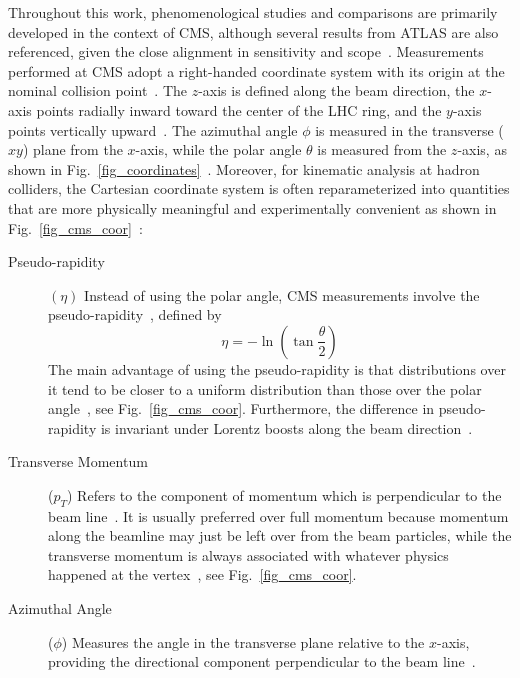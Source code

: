 Throughout this work, phenomenological studies and comparisons are primarily developed in the context of CMS, although several results from ATLAS are also referenced, given the close alignment in sensitivity and scope~\cite{CMS:2008xjf,ATLAS:2008xda}. Measurements performed at CMS adopt a right-handed coordinate system with its origin at the nominal collision point~\cite{CMS:2008xjf}. The $z$-axis is defined along the beam direction, the $x$-axis points radially inward toward the center of the LHC ring, and the $y$-axis points vertically upward~\cite{CMS:2008xjf}. The azimuthal angle $\phi$ is measured in the transverse ($xy$) plane from the $x$-axis, while the polar angle $\theta$ is measured from the $z$-axis, as shown in Fig.~\ref{fig_coordinates}~\cite{CMS:2008xjf}. Moreover, for kinematic analysis at hadron colliders, the Cartesian coordinate system is often reparameterized into quantities that are more physically meaningful and experimentally convenient as shown in Fig.~\ref{fig_cms_coor}~\cite{CMS:PF2017}:

\begin{center}
  
  \label{fig_cms_coor}
\end{center}

\begin{description}
    \item[Pseudo-rapidity] $(\eta)$ Instead of using the polar angle, CMS measurements involve the pseudo-rapidity~\cite{CMS:2008xjf,1674-1137-40-10-100001}, defined by
    $$
    \eta=-\ln \left(\tan \frac{\theta}{2}\right)
    $$
    The main advantage of using the pseudo-rapidity is that distributions over it tend to be closer to a uniform distribution than those over the polar angle~\cite{CMS:PF2017}, see Fig.~\ref{fig_cms_coor}. Furthermore, the difference in pseudo-rapidity is invariant under Lorentz boosts along the beam direction~\cite{1674-1137-40-10-100001}.
    
    \item[Transverse Momentum] ($p_T$) Refers to the component of momentum which is perpendicular to the beam line~\cite{CMS:PF2017}. It is usually preferred over full momentum because momentum along the beamline may just be left over from the beam particles, while the transverse momentum is always associated with whatever physics happened at the vertex~\cite{CMS:PF2017}, see Fig.~\ref{fig_cms_coor}.
    
    \item[Azimuthal Angle] ($\phi$) Measures the angle in the transverse plane relative to the $x$-axis, providing the directional component perpendicular to the beam line~\cite{CMS:2008xjf}.
\end{description}

